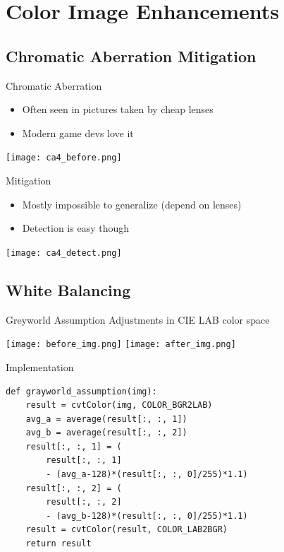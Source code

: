 \documentclass[pdf]{beamer}
\begin{document}
\section{Color Image Enhancements}
\frame{\tableofcontents[currentsection]}
\subsection{Chromatic Aberration Mitigation}
\begin{frame}{Chromatic Aberration}
  \begin{itemize}
    \item Often seen in pictures taken by cheap lenses
    \item Modern game devs love it
  \end{itemize}
  \begin{center}
    \texttt{[image: ca4\_before.png]}
  \end{center}
\end{frame}

\begin{frame}{Mitigation}
  \begin{itemize}
    \item Mostly impossible to generalize (depend on lenses)
    \item Detection is easy though
  \end{itemize}
  \begin{center}
    \texttt{[image: ca4\_detect.png]}
  \end{center}
\end{frame}

\subsection{White Balancing}
\begin{frame}{Greyworld Assumption}\LARGE
  Adjustments in CIE LAB color space
  \begin{center}
    \texttt{[image: before\_img.png]}
    \texttt{[image: after\_img.png]}
  \end{center}
\end{frame}

\begin{frame}[fragile]{Implementation}
\begin{verbatim}
def grayworld_assumption(img):
    result = cvtColor(img, COLOR_BGR2LAB)
    avg_a = average(result[:, :, 1])
    avg_b = average(result[:, :, 2])
    result[:, :, 1] = (
        result[:, :, 1]
        - (avg_a-128)*(result[:, :, 0]/255)*1.1)
    result[:, :, 2] = (
        result[:, :, 2]
        - (avg_b-128)*(result[:, :, 0]/255)*1.1)
    result = cvtColor(result, COLOR_LAB2BGR)
    return result
\end{verbatim}
\end{frame}
\end{document}

